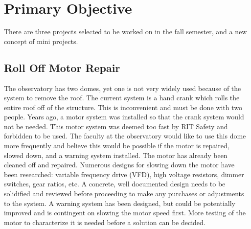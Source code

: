 \documentclass[conference]{IEEEtran} %
\begin{document}
\section{Primary Objective}
\label{sec:primary-obj}

There are three projects selected to be worked on in the fall semester, and a new concept of mini projects.  

\subsection{Roll Off Motor Repair}
\label{subsec:rolloff}
The observatory has two domes, yet one is not very widely used because of the system to remove the roof. The current system is a hand crank which rolls the entire roof off of the structure. This is inconvenient and must be done with two people. Years ago, a motor system was installed so that the crank system would not be needed. This motor system was deemed too fast by RIT Safety and forbidden to be used. The faculty at the observatory would like to use this dome more frequently and believe this would be possible if the motor is repaired, slowed down, and a warning system installed. The motor has already been cleaned off and repaired. Numerous designs for slowing down the motor have been researched: variable frequency drive (VFD), high voltage resistors, dimmer switches, gear ratios, etc. A concrete, well documented design needs to be solidified and reviewed before proceeding to make any purchases or adjustments to the system. A warning system has been designed, but could be potentially improved and is contingent on slowing the motor speed first. More testing of the motor to characterize it is needed before a solution can be decided.
\end{document}
